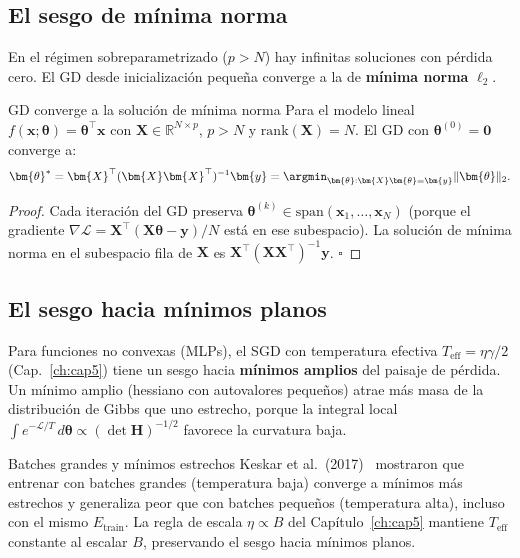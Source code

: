 
\subsection{El sesgo de mínima norma}
\label{subsec:min_norma}

En el régimen sobreparametrizado ($p > N$) hay infinitas soluciones con
pérdida cero. El GD desde inicialización pequeña converge a la de
\textbf{mínima norma} $\ell_2$.

\begin{proposicion}{GD converge a la solución de mínima norma}
\label{prop:min_norma}
Para el modelo lineal $f(\bm{x};\bm{\theta}) = \bm{\theta}^\top\bm{x}$
con $\bm{X} \in \mathbb{R}^{N \times p}$, $p > N$ y
$\text{rank}(\bm{X}) = N$. El GD con $\bm{\theta}^{(0)} = \bm{0}$
converge a:
\begin{equation}
  \bm{\theta}^* = \bm{X}^\top(\bm{X}\bm{X}^\top)^{-1}\bm{y}
  = \argmin_{\bm{\theta}:\bm{X}\bm{\theta}=\bm{y}}
  \|\bm{\theta}\|_2.
  \label{eq:min_norma}
\end{equation}
\end{proposicion}

\begin{proof}
Cada iteración del GD preserva $\bm{\theta}^{(k)} \in
\text{span}(\bm{x}_1,\ldots,\bm{x}_N)$ (porque el gradiente
$\nabla\mathcal{L} = \bm{X}^\top(\bm{X}\bm{\theta}-\bm{y})/N$ está en
ese subespacio). La solución de mínima norma en el subespacio fila de
$\bm{X}$ es $\bm{X}^\top(\bm{X}\bm{X}^\top)^{-1}\bm{y}$. $\square$
\end{proof}

\subsection{El sesgo hacia mínimos planos}
\label{subsec:min_planos}

Para funciones no convexas (MLPs), el SGD con temperatura efectiva
$T_{\text{eff}} = \eta\gamma/2$ (Cap.~\ref{ch:cap5}) tiene un sesgo
hacia \textbf{mínimos amplios} del paisaje de pérdida. Un mínimo amplio
(hessiano con autovalores pequeños) atrae más masa de la distribución de
Gibbs que uno estrecho, porque la integral local
$\int e^{-\mathcal{L}/T}\,d\bm{\theta} \propto (\det\bm{H})^{-1/2}$
favorece la curvatura baja.

\begin{observacion}{Batches grandes y mínimos estrechos}
Keskar et al.\ (2017)~\cite{keskar2017large} mostraron que entrenar con
batches grandes (temperatura baja) converge a mínimos más estrechos y
generaliza peor que con batches pequeños (temperatura alta), incluso con
el mismo $E_{\text{train}}$. La regla de escala $\eta \propto B$ del
Capítulo~\ref{ch:cap5} mantiene $T_{\text{eff}}$ constante al escalar
$B$, preservando el sesgo hacia mínimos planos.
\end{observacion}

